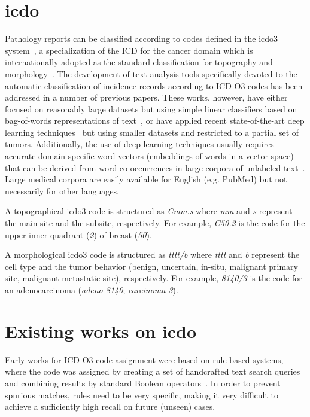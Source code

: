 \section{\ac{icdo}}
Pathology reports can be classified according
to codes defined in the \ac{icdo3}
system~\cite{fritz_international_2000}, a specialization of the ICD
for the cancer domain which is internationally adopted as the standard
classification for topography and
morphology~\cite{airtum_handbook_2008}.  The development of text
analysis tools specifically devoted to the automatic classification of
incidence records according to ICD-O3 codes has been addressed in a
number of previous papers. These
works, however, have either focused on reasonably large datasets but
using simple linear classifiers based on bag-of-words representations
of text~\cite{jouhet_automated_2011,kavuluru_automatic_2013}, or have
applied recent state-of-the-art deep learning
techniques~\cite{gao_hierarchical_2018,qiu_deep_2018} but using
smaller datasets and restricted to a partial set of
tumors. Additionally, the use of deep learning techniques usually
requires accurate domain-specific word vectors (embeddings of words in
a vector space) that can be derived from word co-occurrences in large
corpora of unlabeled
text~\cite{mikolov_linguistic_2013,pennington_glove:_2014,devlin2018bert}. Large
medical corpora are easily available for English (e.g. PubMed) but not
necessarily for other languages.

A topographical \ac{icdo3} code is structured as \emph{Cmm.s} where
\emph{mm} and \emph{s} represent the main site and the subsite,
respectively. For example, \emph{C50.2}
is the code for the upper-inner quadrant (\emph{2}) of breast (\emph{50}).

A morphological \ac{icdo3} code is structured as \emph{tttt/b}
where \emph{tttt} and \emph{b} represent the cell type and the tumor
behavior (benign, uncertain, in-situ, malignant primary site,
malignant metastatic site), respectively. For example, \emph{8140/3}
is the code for an adenocarcinoma (\emph{adeno 8140};
\emph{carcinoma 3}).

\section{Existing works on \ac{icdo}}
Early works for ICD-O3 code assignment were based on rule-based
systems, where the code was assigned by creating a set of handcrafted
text search queries and combining results by standard Boolean
operators~\cite{crocetti_automatic_2004}. In order to prevent spurious
matches, rules need to be very specific, making it very difficult to
achieve a sufficiently high recall on future (unseen) cases.


